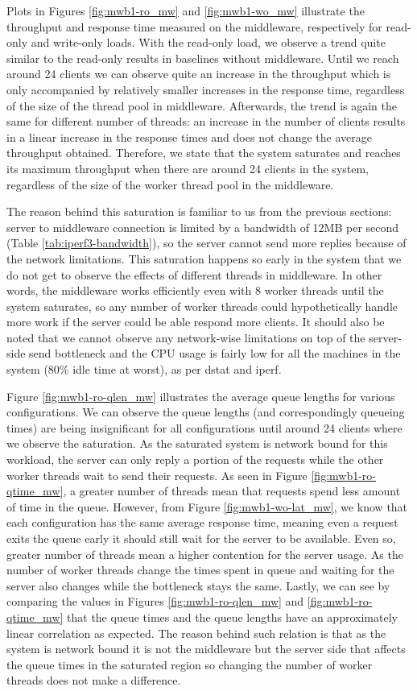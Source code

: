 \documentclass[11pt,a4paper]{article}
\begin{document}
Plots in Figures \ref{fig:mwb1-ro_mw} and \ref{fig:mwb1-wo_mw} illustrate the throughput and response time measured on the middleware, respectively for read-only and write-only loads. With the read-only load, we observe a trend quite similar to the read-only results in baselines without middleware. Until we reach around 24 clients we can observe quite an increase in the throughput which is only accompanied by relatively smaller increases in the response time, regardless of the size of the thread pool in middleware. Afterwards, the trend is again the same for different number of threads: an increase in the number of clients results in a linear increase in the response times and does not change the average throughput obtained. Therefore, we state that the system saturates and reaches its maximum throughput when there are around 24 clients in the system, regardless of the size of the worker thread pool in the middleware.
\par The reason behind this saturation is familiar to us from the previous sections: server to middleware connection is limited by a bandwidth of 12MB per second (Table \ref{tab:iperf3-bandwidth}), so the server cannot send more replies because of the network limitations. This saturation happens so early in the system that we do not get to observe the effects of different threads in middleware. In other words, the middleware works efficiently even with 8 worker threads until the system saturates, so any number of worker threads could hypothetically handle more work if the server could be able respond more clients. It should also be noted that we cannot observe any network-wise limitations on top of the server-side send bottleneck and the CPU usage is fairly low for all the machines in the system ($80\%$ idle time at worst), as per dstat and iperf.
\par Figure \ref{fig:mwb1-ro-qlen_mw} illustrates the average queue lengths for various configurations. We can observe the queue lengths (and correspondingly queueing times) are being insignificant for all configurations until around 24 clients where we observe the saturation. As the saturated system is network bound for this workload, the server can only reply a portion of the requests while the other worker threads wait to send their requests. As seen in Figure \ref{fig:mwb1-ro-qtime_mw}, a greater number of threads mean that requests spend less amount of time in the queue. However, from Figure \ref{fig:mwb1-wo-lat_mw}, we know that each configuration has the same average response time, meaning even a request exits the queue early it should still wait for the server to be available. Even so, greater number of threads mean a higher contention for the server usage. As the number of worker threads change the times spent in queue and waiting for the server also changes while the bottleneck stays the same. Lastly, we can see by comparing the values in Figures \ref{fig:mwb1-ro-qlen_mw} and \ref{fig:mwb1-ro-qtime_mw} that the queue times and the queue lengths have an approximately linear correlation as expected. The reason behind such relation is that as the system is network bound it is not the middleware but the server side that affects the queue times in the saturated region so changing the number of worker threads does not make a difference.
\end{document}
